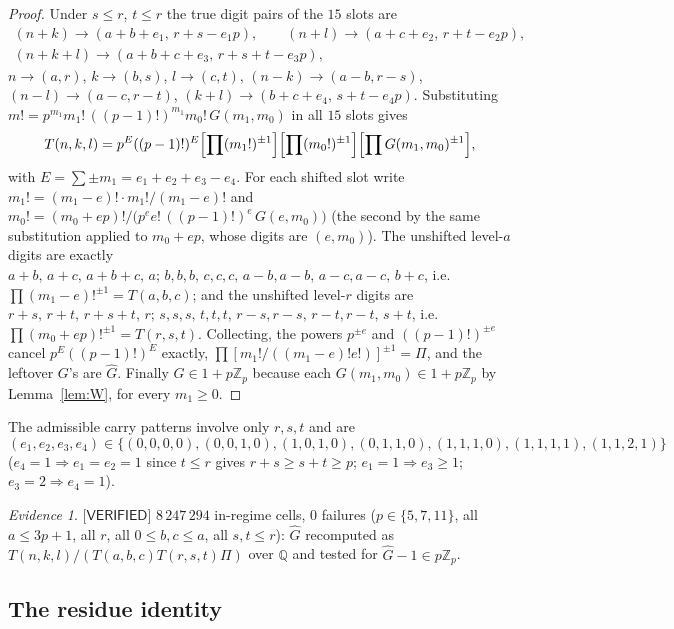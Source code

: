 \documentclass[11pt,reqno]{amsart}
\theoremstyle{plain}
\theoremstyle{definition}
\theoremstyle{remark}
\newtheorem{evidence}[theorem]{Evidence}
\numberwithin{equation}{section}
\newcommand{\ZZ}{\mathbb{Z}}
\newcommand{\QQ}{\mathbb{Q}}
\newcommand{\Zp}{\ZZ_p}
\newcommand{\VERIFIED}{\textsf{[VERIFIED]}}
\begin{document}
\begin{proof}
Under $s\le r$, $t\le r$ the true digit pairs of the $15$ slots are
\[
\begin{gathered}
(n+k)\to(a+b+e_1,\,r+s-e_1p),\qquad (n+l)\to(a+c+e_2,\,r+t-e_2p),\\
(n+k+l)\to(a+b+c+e_3,\,r+s+t-e_3p),
\end{gathered}
\]
$n\to(a,r)$, $k\to(b,s)$, $l\to(c,t)$, $(n-k)\to(a-b,r-s)$, $(n-l)\to(a-c,r-t)$,
$(k+l)\to(b+c+e_4,\,s+t-e_4p)$. Substituting
$m!=p^{m_1}m_1!\,((p-1)!)^{m_1}m_0!\,G(m_1,m_0)$ in all $15$ slots gives
\[
T(n,k,l)=p^{E}((p-1)!)^{E}\Bigl[\prod(m_1!)^{\pm1}\Bigr]\Bigl[\prod(m_0!)^{\pm1}\Bigr]
\Bigl[\prod G(m_1,m_0)^{\pm1}\Bigr],
\]
with $E=\sum\pm m_1=e_1+e_2+e_3-e_4$.
For each shifted slot write $m_1!=(m_1-e)!\cdot m_1!/(m_1-e)!$ and
$m_0!=(m_0+ep)!\big/\bigl(p^ee!\,((p-1)!)^e\,G(e,m_0)\bigr)$ (the second by the same
substitution applied to $m_0+ep$, whose digits are $(e,m_0)$). The unshifted level-$a$ digits
are exactly $a+b,\,a+c,\,a+b+c,\,a;\,b,b,b,\,c,c,c,\,a-b,a-b,\,a-c,a-c,\,b+c$, i.e.
$\prod(m_1-e)!^{\pm1}=T(a,b,c)$; and the unshifted level-$r$ digits are
$r+s,\,r+t,\,r+s+t,\,r;\,s,s,s,\,t,t,t,\,r-s,r-s,\,r-t,r-t,\,s+t$, i.e.
$\prod(m_0+ep)!^{\pm1}=T(r,s,t)$. Collecting, the powers $p^{\pm e}$ and $((p-1)!)^{\pm e}$
cancel $p^E((p-1)!)^E$ exactly, $\prod[m_1!/((m_1-e)!e!)]^{\pm1}=\Pi$, and the leftover $G$'s
are $\hat G$. Finally $\hat G\in1+p\Zp$ because each $G(m_1,m_0)\in1+p\Zp$ by
Lemma~\ref{lem:W}, for every $m_1\ge0$.
\end{proof}

The admissible carry patterns involve only $r,s,t$ and are
\begin{equation}\label{eq:epatterns}
(e_1,e_2,e_3,e_4)\in\{(0,0,0,0),(0,0,1,0),(1,0,1,0),(0,1,1,0),(1,1,1,0),(1,1,1,1),(1,1,2,1)\}
\end{equation}
($e_4=1\Rightarrow e_1=e_2=1$ since $t\le r$ gives $r+s\ge s+t\ge p$; $e_1=1\Rightarrow e_3\ge1$;
$e_3=2\Rightarrow e_4=1$).

\begin{evidence}\label{ev:LemB}
$\VERIFIED$ $8\,247\,294$ in-regime cells, $0$ failures ($p\in\{5,7,11\}$, all $a\le3p+1$, all
$r$, all $0\le b,c\le a$, all $s,t\le r$): $\hat G$ recomputed as
$T(n,k,l)/(T(a,b,c)T(r,s,t)\Pi)$ over $\QQ$ and tested for $\hat G-1\in p\Zp$.
\end{evidence}

\subsection{The residue identity}
\end{document}

